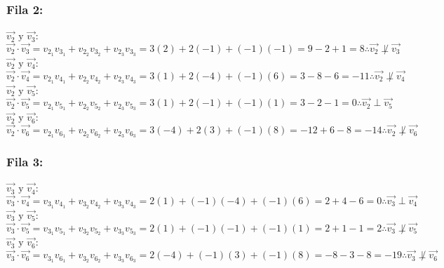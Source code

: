 \documentclass[letterpaper, 12pt]{article}
\begin{document}
\subsubsection*{Fila 2:}
\justify
\(\vec{v_2} \text{ y }\vec{v_3}\):\\ \newline
\(\vec{v_2}\cdot\vec{v_3}=v_{2_1}v_{3_1}+v_{2_2}v_{3_2}+v_{2_3}v_{3_3}=3(2)+2(-1)+(-1)(-1)=9-2+1=8\therefore\vec{v_2}\not\perp \vec{v_3}\)\\ \newline
\(\vec{v_2} \text{ y }\vec{v_4}\):\\ \newline
\(\vec{v_2}\cdot\vec{v_4}=v_{2_1}v_{4_1}+v_{2_2}v_{4_2}+v_{2_3}v_{4_3}=3(1)+2(-4)+(-1)(6)=3-8-6=-11\therefore\vec{v_2}\not\perp \vec{v_4}\)\\ \newline
\(\vec{v_2} \text{ y }\vec{v_5}\):\\ \newline
\(\vec{v_2}\cdot\vec{v_5}=v_{2_1}v_{5_1}+v_{2_2}v_{5_2}+v_{2_3}v_{5_3}=3(1)+2(-1)+(-1)(1)=3-2-1=0\therefore\vec{v_2}\perp \vec{v_5}\)\\ \newline
\(\vec{v_2} \text{ y }\vec{v_6}\):\\ \newline
\(\vec{v_2}\cdot\vec{v_6}=v_{2_1}v_{6_1}+v_{2_2}v_{6_2}+v_{2_3}v_{6_3}=3(-4)+2(3)+(-1)(8)=-12+6-8=-14\therefore\vec{v_2}\not\perp \vec{v_6}\)
\subsubsection*{Fila 3:}
\justify
\(\vec{v_3} \text{ y }\vec{v_4}\):\\ \newline
\(\vec{v_3}\cdot\vec{v_4}=v_{3_1}v_{4_1}+v_{3_2}v_{4_2}+v_{3_3}v_{4_3}=2(1)+(-1)(-4)+(-1)(6)=2+4-6=0\therefore\vec{v_3}\perp \vec{v_4}\)\\ \newline
\(\vec{v_3} \text{ y }\vec{v_5}\):\\ \newline
\(\vec{v_3}\cdot\vec{v_5}=v_{3_1}v_{5_1}+v_{3_2}v_{5_2}+v_{3_3}v_{5_3}=2(1)+(-1)(-1)+(-1)(1)=2+1-1=2\therefore\vec{v_3}\not\perp \vec{v_5}\)\\ \newline
\(\vec{v_3} \text{ y }\vec{v_6}\):\\ \newline
\(\vec{v_3}\cdot\vec{v_6}=v_{3_1}v_{6_1}+v_{3_2}v_{6_2}+v_{3_3}v_{6_3}=2(-4)+(-1)(3)+(-1)(8)=-8-3-8=-19\therefore\vec{v_3}\not\perp \vec{v_6}\)
\end{document}
